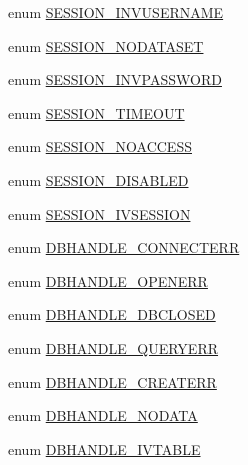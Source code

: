 \begin{Indent}{\bf }\par
\begin{CompactItemize}
\item 
enum \hyperlink{owl_8statuscodes_8php_9d228a8481d3e68d6c8034fd41e1284f}{SESSION\_\-INVUSERNAME} 
\item 
enum \hyperlink{owl_8statuscodes_8php_61e828f14b93df840752f73190104a50}{SESSION\_\-NODATASET} 
\item 
enum \hyperlink{owl_8statuscodes_8php_44b42092523fa97db313970c190ea28b}{SESSION\_\-INVPASSWORD} 
\item 
enum \hyperlink{owl_8statuscodes_8php_9f864ccc821ad3799322c4a6793796dc}{SESSION\_\-TIMEOUT} 
\item 
enum \hyperlink{owl_8statuscodes_8php_a1062a5298847727e0d3be4eab23d210}{SESSION\_\-NOACCESS} 
\item 
enum \hyperlink{owl_8statuscodes_8php_776112495f2ed2c5e256dcdfad21fe7e}{SESSION\_\-DISABLED} 
\item 
enum \hyperlink{owl_8statuscodes_8php_9897ac79456358fa862ca33fdea13bb9}{SESSION\_\-IVSESSION} 
\end{CompactItemize}
\end{Indent}
\begin{Indent}{\bf }\par
\begin{CompactItemize}
\item 
enum \hyperlink{owl_8statuscodes_8php_9a343c4560417e293caa709e22646196}{DBHANDLE\_\-CONNECTERR} 
\item 
enum \hyperlink{owl_8statuscodes_8php_b64cc6f10455b678241bc8b714100e16}{DBHANDLE\_\-OPENERR} 
\item 
enum \hyperlink{owl_8statuscodes_8php_ab8d7571a5e75d71060fbcb865433490}{DBHANDLE\_\-DBCLOSED} 
\item 
enum \hyperlink{owl_8statuscodes_8php_04ae2b6da16ff57c8c425aa57561b030}{DBHANDLE\_\-QUERYERR} 
\item 
enum \hyperlink{owl_8statuscodes_8php_e18225c004a543b76af09a71c10a8f4f}{DBHANDLE\_\-CREATERR} 
\item 
enum \hyperlink{owl_8statuscodes_8php_d8e472506309827bb507ccf4f1545e0e}{DBHANDLE\_\-NODATA} 
\item 
enum \hyperlink{owl_8statuscodes_8php_6d2955056daf49887e50eea132eb595e}{DBHANDLE\_\-IVTABLE} 
\end{CompactItemize}
\end{Indent}
